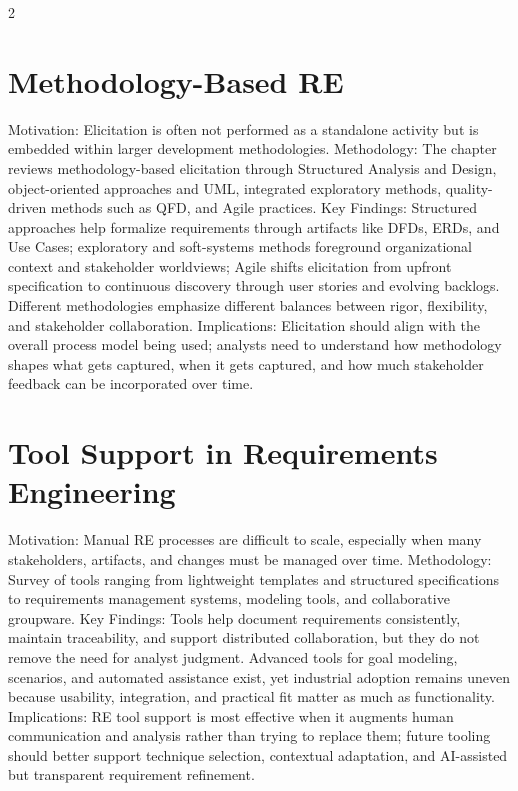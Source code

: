 \documentclass[8pt,a4paper]{extarticle}
\begin{document}
\begin{multicols*}{2}
    \section{Methodology-Based RE}
    Motivation: Elicitation is often not performed as a standalone activity but is embedded within larger development methodologies. Methodology: The chapter reviews methodology-based elicitation through Structured Analysis and Design, object-oriented approaches and UML, integrated exploratory methods, quality-driven methods such as QFD, and Agile practices. Key Findings: Structured approaches help formalize requirements through artifacts like DFDs, ERDs, and Use Cases; exploratory and soft-systems methods foreground organizational context and stakeholder worldviews; Agile shifts elicitation from upfront specification to continuous discovery through user stories and evolving backlogs. Different methodologies emphasize different balances between rigor, flexibility, and stakeholder collaboration. Implications: Elicitation should align with the overall process model being used; analysts need to understand how methodology shapes what gets captured, when it gets captured, and how much stakeholder feedback can be incorporated over time.

    \section{Tool Support in Requirements Engineering}
    Motivation: Manual RE processes are difficult to scale, especially when many stakeholders, artifacts, and changes must be managed over time. Methodology: Survey of tools ranging from lightweight templates and structured specifications to requirements management systems, modeling tools, and collaborative groupware. Key Findings: Tools help document requirements consistently, maintain traceability, and support distributed collaboration, but they do not remove the need for analyst judgment. Advanced tools for goal modeling, scenarios, and automated assistance exist, yet industrial adoption remains uneven because usability, integration, and practical fit matter as much as functionality. Implications: RE tool support is most effective when it augments human communication and analysis rather than trying to replace them; future tooling should better support technique selection, contextual adaptation, and AI-assisted but transparent requirement refinement.


\end{multicols*}
\end{document}
